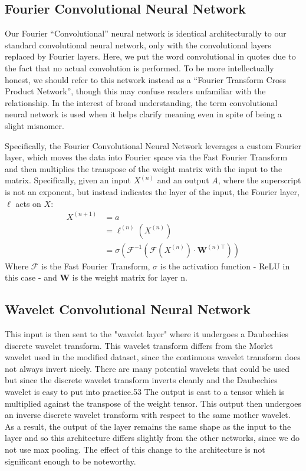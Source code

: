 \subsection{Fourier Convolutional Neural Network}
Our Fourier ``Convolutional'' neural network is identical architecturally to our standard convolutional neural network, only with the convolutional layers replaced by Fourier layers.
Here, we put the word convolutional in quotes due to the fact that no actual convolution is performed.
To be more intellectually honest, we should refer to this network instead as a ``Fourier Transform Cross Product Network'', though this may confuse readers unfamiliar with the relationship.
In the interest of broad understanding, the term convolutional neural network is used when it helps clarify meaning even in spite of being a slight misnomer.

Specifically, the Fourier Convolutional Neural Network leverages a custom Fourier layer, which moves the data into Fourier space via the Fast Fourier Transform and then multiplies the transpose of the weight matrix with the input to the matrix.
Specifically, given an input $X^{(n)}$ and an output $A$, where the superscript is not an exponent, but instead indicates the layer of the input, the Fourier layer, $\ell$ acts on $X$:
\begin{align*}
X^{(n+1)} & = a \\
& = \ell^{(n)}(X^{(n)}) \\
& = \sigma(\mathcal{F}^{-1}(\mathcal{F}(X^{(n)})\cdot \mathbf{W}^{(n)\top}))
\end{align*}
Where $\mathcal{F}$ is the Fast Fourier Transform, $\sigma$ is the activation function - ReLU in this case - and $\mathbf{W}$ is the weight matrix for layer n.

\subsection{Wavelet Convolutional Neural Network} \label{wavelet cnn}
This input is then sent to the "wavelet layer" where it undergoes a Daubechies discrete wavelet transform.
This wavelet transform differs from the Morlet wavelet used in the modified dataset, since the continuous wavelet transform does not always invert nicely.
There are many potential wavelets that could be used~\cite{mallat1999wavelet} but since the discrete wavelet transform inverts cleanly and the Daubechies wavelet is easy to put into practice.53
The output is cast to a tensor which is multiplied against the transpose of the weight tensor.
This output then undergoes an inverse discrete wavelet transform with respect to the same mother wavelet.
As a result, the output of the layer remains the same shape as the input to the layer and so this architecture differs slightly from the other networks, since we do not use max pooling. 
The effect of this change to the architecture is not significant enough to be noteworthy.

